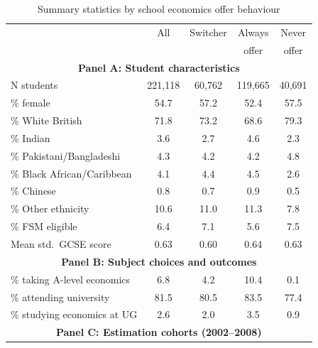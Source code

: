 \begin{table}[htbp]
\centering
\caption{Summary statistics by school economics offer behaviour}
\label{tab:summary_stats}
\begin{tabular}{l cccc}
\toprule
                              & All        & Switcher   & Always     & Never      \\
                              &            &            & offer      & offer      \\
\midrule
\multicolumn{5}{c}{\textbf{Panel A: Student characteristics}} \\
\midrule
N students                    & 221,118         & 60,762         & 119,665         & 40,691         \\
\% female                     & 54.7         & 57.2         & 52.4         & 57.5         \\
\addlinespace
\% White British              & 71.8         & 73.2         & 68.6         & 79.3         \\
\% Indian                     & 3.6         & 2.7         & 4.6         & 2.3         \\
\% Pakistani/Bangladeshi      & 4.3        & 4.2         & 4.2         & 4.8         \\
\% Black African/Caribbean    & 4.1         & 4.4         & 4.5         & 2.6         \\
\% Chinese                    & 0.8         & 0.7         & 0.9         & 0.5         \\
\% Other ethnicity            & 10.6         & 11.0         & 11.3         & 7.8         \\
\addlinespace
\% FSM eligible               & 6.4         & 7.1         & 5.6         & 7.5         \\
Mean std.\ GCSE score         & 0.63         & 0.60         & 0.64         & 0.63         \\
\midrule
\multicolumn{5}{c}{\textbf{Panel B: Subject choices and outcomes}} \\
\midrule
\% taking A-level economics   & 6.8         & 4.2         & 10.4         & 0.1         \\
\% attending university       & 81.5         & 80.5         & 83.5         & 77.4         \\
\% studying economics at UG   & 2.6         & 2.0         & 3.5         & 0.9         \\
\midrule
\multicolumn{5}{c}{\textbf{Panel C: Estimation cohorts (2002--2008)}} \\

\end{tabular}
\end{table}
